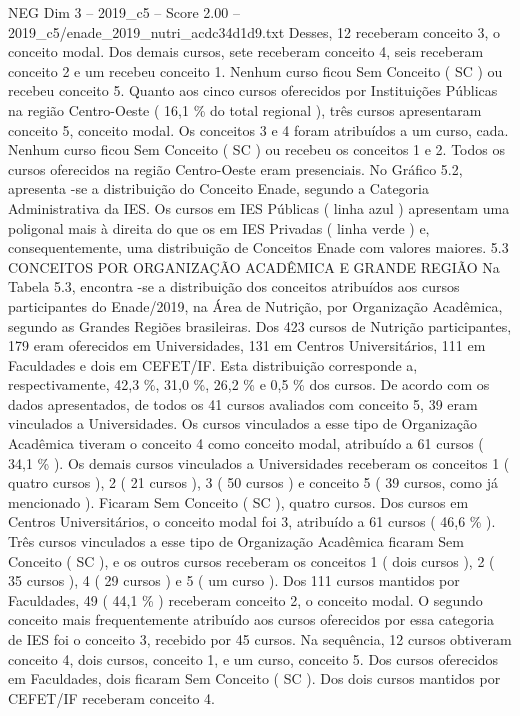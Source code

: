\begin{textsample}{NEG Dim 3 – 2019\_c5 – Score 2.00 – 2019\_c5/enade\_2019\_nutri\_acdc34d1d9.txt}
Desses, 12 receberam conceito 3, o conceito modal.
Dos demais cursos, sete receberam conceito 4, seis receberam conceito 2 e um recebeu conceito 1.
Nenhum curso ficou Sem Conceito ( SC ) ou recebeu conceito 5.
Quanto aos cinco cursos oferecidos por Instituições Públicas na região Centro-Oeste ( 16,1 \% do total regional ), três cursos apresentaram conceito 5, conceito modal.
Os conceitos 3 e 4 foram atribuídos a um curso, cada.
Nenhum curso ficou Sem Conceito ( SC ) ou recebeu os conceitos 1 e 2.
Todos os cursos oferecidos na região Centro-Oeste eram presenciais.
No Gráfico 5.2, apresenta -se a distribuição do Conceito Enade, segundo a Categoria Administrativa da IES.
Os cursos em IES Públicas ( linha azul ) apresentam uma poligonal mais à direita do que os em IES Privadas ( linha verde ) e, consequentemente, uma distribuição de Conceitos Enade com valores maiores. 5.3 CONCEITOS POR ORGANIZAÇÃO ACADÊMICA E GRANDE REGIÃO Na Tabela 5.3, encontra -se a distribuição dos conceitos atribuídos aos cursos participantes do Enade/2019, na Área de Nutrição, por Organização Acadêmica, segundo as Grandes Regiões brasileiras.
Dos 423 cursos de Nutrição participantes, 179 eram oferecidos em Universidades, 131 em Centros Universitários, 111 em Faculdades e dois em CEFET/IF.
Esta distribuição corresponde a, respectivamente, 42,3 \%, 31,0 \%, 26,2 \% e 0,5 \% dos cursos.
De acordo com os dados apresentados, de todos os 41 cursos avaliados com conceito 5, 39 eram vinculados a Universidades.
Os cursos vinculados a esse tipo de Organização Acadêmica tiveram o conceito 4 como conceito modal, atribuído a 61 cursos ( 34,1 \% ).
Os demais cursos vinculados a Universidades receberam os conceitos 1 ( quatro cursos ), 2 ( 21 cursos ), 3 ( 50 cursos ) e conceito 5 ( 39 cursos, como já mencionado ).
Ficaram Sem Conceito ( SC ), quatro cursos.
Dos cursos em Centros Universitários, o conceito modal foi 3, atribuído a 61 cursos ( 46,6 \% ).
Três cursos vinculados a esse tipo de Organização Acadêmica ficaram Sem Conceito ( SC ), e os outros cursos receberam os conceitos 1 ( dois cursos ), 2 ( 35 cursos ), 4 ( 29 cursos ) e 5 ( um curso ).
Dos 111 cursos mantidos por Faculdades, 49 ( 44,1 \% ) receberam conceito 2, o conceito modal.
O segundo conceito mais frequentemente atribuído aos cursos oferecidos por essa categoria de IES foi o conceito 3, recebido por 45 cursos.
Na sequência, 12 cursos obtiveram conceito 4, dois cursos, conceito 1, e um curso, conceito 5.
Dos cursos oferecidos em Faculdades, dois ficaram Sem Conceito ( SC ).
Dos dois cursos mantidos por CEFET/IF receberam conceito 4.

\end{textsample}
